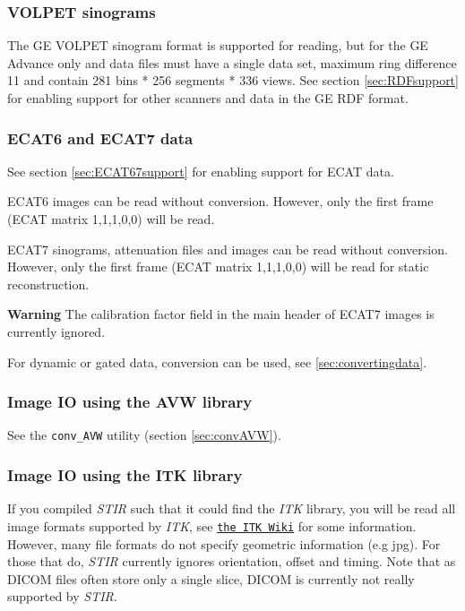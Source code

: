 \documentclass{article}
\def\R2Lurl#1#2{\mbox{\href{#1}{\tt #2}}}
\begin{document}
\subsubsection{VOLPET sinograms}

The GE VOLPET sinogram format is supported for reading, but for
the GE Advance only and data files must have a single data set, maximum ring 
difference 11 and contain 281 bins * 256 segments * 336 views. 
See section \ref{sec:RDFsupport} for enabling support for other scanners and
data in the GE RDF format.

\subsubsection{ECAT6 and ECAT7 data} 
See section \ref{sec:ECAT67support} for enabling support for ECAT data.

ECAT6 images can be read without conversion. However, only the 
first frame (ECAT matrix 1,1,1,0,0) will be read.

ECAT7 sinograms, attenuation files and images can be read without 
conversion. However, only the first frame (ECAT matrix 1,1,1,0,0) 
will be read for static reconstruction.

\textbf{Warning} The calibration factor field in the main header of ECAT7 images
is currently ignored.

For dynamic or gated data, conversion can be used, see \ref{sec:convertingdata}.

\subsubsection{Image IO using the AVW library}
See the \texttt{conv\_AVW} utility (section \ref{sec:convAVW}).

\subsubsection{Image IO using the ITK library \label{sec:ITKIO}}
If you compiled \textit{STIR} such that it could find the \textit{ITK} library, you will be read
all image formats supported by \textit{ITK}, see \R2Lurl{http://www.itk.org/Wiki/ITK/File_Formats}{the ITK Wiki}
for some information. However, many file formats do not specify geometric information (e.g jpg). For those
that do, \textit{STIR} currently ignores orientation, offset and timing.
Note that as DICOM files often store only a single slice, DICOM is currently not really supported by \textit{STIR}.
\end{document}
